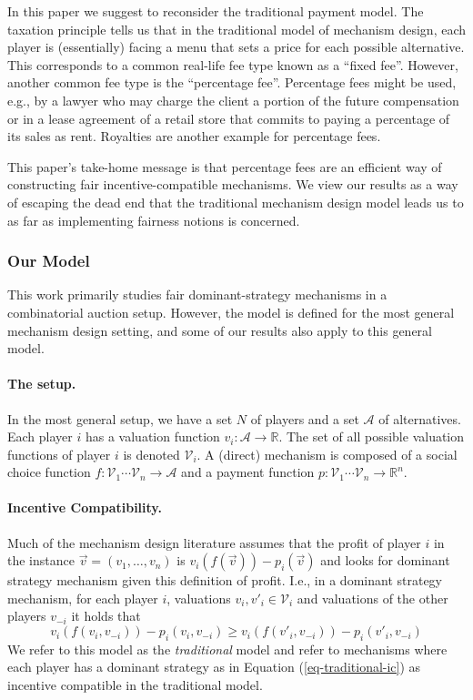 \documentclass{theoretics}
\newcommand{\cA}{{\mathcal A}}
\begin{document}
In this paper we suggest to reconsider the traditional payment model. The taxation principle tells us that in the traditional model of mechanism design, each player is (essentially) facing a menu that sets a price for each possible alternative. This corresponds to a common real-life fee type known as a ``fixed fee''. However, another common fee type is the ``percentage fee''. Percentage fees might be used, e.g., by a lawyer who may charge the client a portion of the future compensation or
in a lease agreement of a retail store that commits to paying a percentage of its sales as rent. Royalties are another example for percentage fees. 

This paper's take-home message is that percentage fees are an efficient way of constructing fair incentive-compatible mechanisms. We view our results as a way of escaping the dead end that the traditional mechanism design model leads us to as far as implementing fairness notions is concerned. 

\subsubsection*{Our Model}

This work primarily studies fair dominant-strategy mechanisms in a combinatorial auction setup. However, the model is defined for the most general mechanism design setting, and some of our results also apply to this general model.

\paragraph{The setup.} In the most general setup, we have a set $N$ of players and a set $\cA$ of alternatives. Each player $i$ has a valuation function $v_i:\mathcal A \rightarrow \mathbb R$. The set of all possible valuation functions of player $i$ is denoted $\mathcal V_i$. A (direct) mechanism is composed of a social choice function $f:\mathcal V_1 \cdots \mathcal V_n\rightarrow \mathcal A$ and a payment function $p:\mathcal V_1 \cdots \mathcal V_n\rightarrow \mathbb R^n$. 

\paragraph{Incentive Compatibility.} Much of the mechanism design literature assumes that the profit of player $i$ in the instance $\overrightarrow v=(v_1,\ldots, v_n)$ is $v_i(f(\overrightarrow v))-p_i(\overrightarrow v)$ and looks for dominant strategy mechanism given this definition of profit. I.e., in a dominant strategy mechanism, for each player $i$, valuations $v_i,v'_i\in \mathcal V_i$ and valuations of the other players $v_{-i}$ it holds that
\begin{equation}\label{eq-traditional-ic}
v_i(f(v_i,v_{-i}))-p_i(v_i,v_{-i}) \geq v_i(f(v'_i,v_{-i}))-p_i(v'_i,v_{-i})
\end{equation}
We refer to this model as the \emph{traditional} model and refer to mechanisms where each player has a dominant strategy as in Equation (\ref{eq-traditional-ic}) as incentive compatible in the traditional model.
\end{document}
